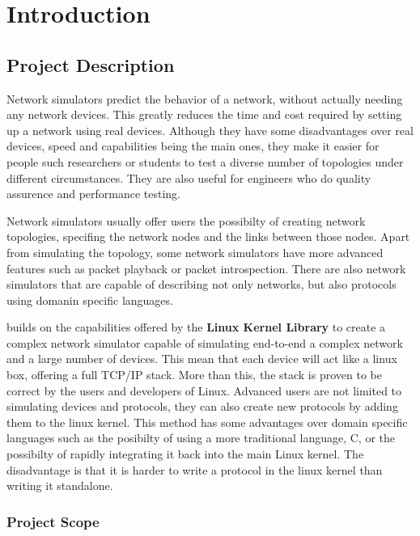 \chapter{Introduction}
\label{chapter:intro}

\section{Project Description}
\label{sec:proj}

Network simulators predict the behavior of a network, without actually needing any network devices.
This greatly reduces the time and cost required by setting up a network using real devices. Although
they have some disadvantages over real devices, speed and capabilities being the main ones, they
make it easier for people such researchers or students to test a diverse number of topologies under
different circumstances. They are also useful for engineers who do quality assurence and performance
testing.

Network simulators usually offer users the possibilty of creating network topologies, specifing the
network nodes and the links between those nodes. Apart from simulating the topology, some network
simulators have more advanced features such as packet playback or packet introspection.
There are also network simulators that are capable of describing not only networks, but also protocols
using domanin specific languages.

\textbf{\project} builds on the capabilities offered by the \textbf{Linux Kernel Library} to create
a complex network simulator capable of simulating end-to-end a complex network and a large number
of devices. This mean that each device will act like a linux box, offering a full TCP/IP stack.
More than this, the stack is proven to be correct by the users and developers of Linux. Advanced
users are not limited to simulating devices and protocols, they can also create new protocols by
adding them to the linux kernel. This method has some advantages over domain specific languages such
as the posibilty of using a more traditional language, C, or the possibilty of rapidly integrating
it back into the main Linux kernel. The disadvantage is that it is harder to write a protocol
in the linux kernel than writing it standalone.

\subsection{Project Scope}
\label{sub-sec:proj-scope}

